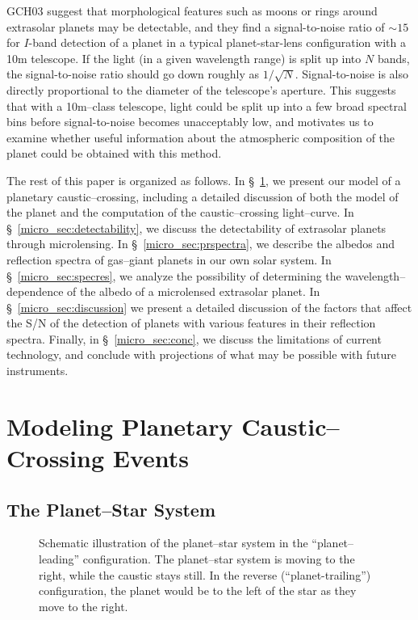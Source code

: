 GCH03 suggest that morphological features such as moons or rings
around extrasolar planets may be detectable, and they find a
signal-to-noise ratio of $\sim 15$ for $I$-band detection of a planet
in a typical planet-star-lens configuration with a 10m telescope.  If
the light (in a given wavelength range) is split up into $N$ bands,
the signal-to-noise ratio should go down roughly as $1/\sqrt{N}$.
Signal-to-noise is also directly proportional to the diameter of the
telescope's aperture.  This suggests that with a 10m--class telescope,
light could be split up into a few broad spectral bins before
signal-to-noise becomes unacceptably low, and motivates us to examine
whether useful information about the atmospheric composition of the
planet could be obtained with this method.

The rest of this paper is organized as follows. In \S~\ref{micro_sec:model},
we present our model of a planetary caustic--crossing, including a
detailed discussion of both the model of the planet and the
computation of the caustic--crossing light--curve. In
\S~\ref{micro_sec:detectability}, we discuss the detectability of extrasolar
planets through microlensing. In \S~\ref{micro_sec:prspectra}, we describe
the albedos and reflection spectra of gas--giant planets in our own
solar system. In \S~\ref{micro_sec:specres}, we analyze the possibility of
determining the wavelength--dependence of the albedo of a microlensed
extrasolar planet.  In \S~\ref{micro_sec:discussion} we present a detailed
discussion of the factors that affect the S/N of the detection of
planets with various features in their reflection spectra.  Finally,
in \S~\ref{micro_sec:conc}, we discuss the limitations of current
technology, and conclude with projections of what may be possible with
future instruments.

\section{Modeling Planetary Caustic--Crossing Events}
\label{micro_sec:model}

\subsection{The Planet--Star System}
\label{micro_ssec:pssystem}

\begin{figure}[p]
\caption[Schematic illustration of the planet--star system in the
``planet--leading'' configuration.]{Schematic illustration of the
planet--star system in the ``planet--leading'' configuration.  The
planet--star system is moving to the right, while the caustic stays
still.  In the reverse (``planet-trailing'') configuration, the planet
would be to the left of the star as they move to the right.}
\label{micro_fig:intercaustic} 
\end{figure}
\afterpage{\clearpage}

